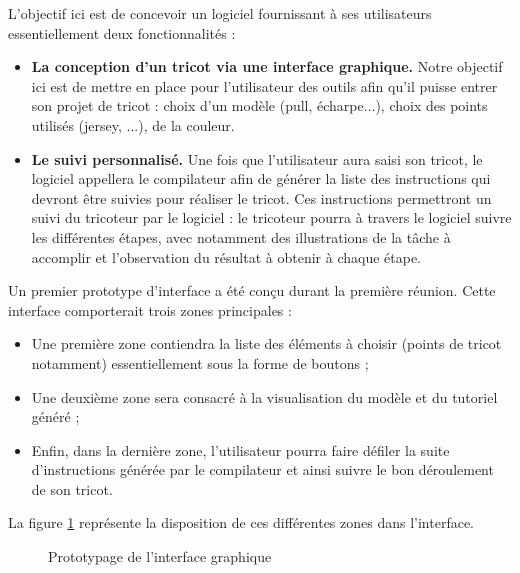 \documentclass{article}
\begin{document}
L'objectif ici est de concevoir un logiciel fournissant à ses utilisateurs essentiellement deux fonctionnalités :
\begin{itemize}
  \item \textbf{La conception d'un tricot via une interface graphique.} Notre objectif ici est de mettre en place pour l'utilisateur des
  outils afin qu'il puisse entrer son projet de tricot : choix d'un modèle (pull, écharpe...), choix des points utilisés
  (jersey, ...), de la couleur.
  \item \textbf{Le suivi personnalisé.} Une fois que l'utilisateur aura saisi son tricot, le logiciel appellera le compilateur afin de générer
la liste des instructions qui devront être suivies pour réaliser le tricot. Ces instructions permettront un suivi du tricoteur par le
logiciel : le tricoteur pourra à travers le logiciel suivre les différentes étapes, avec notamment des illustrations de la tâche à
accomplir et l'observation du résultat à obtenir à chaque étape. \newline
\end{itemize} 

Un premier prototype d'interface a été conçu durant la première réunion. Cette interface comporterait trois zones principales :
\begin{itemize}
  \item Une première zone contiendra la liste des éléments à choisir (points de tricot notamment) essentiellement sous la forme de 
boutons ;
  \item Une deuxième zone sera consacré à la visualisation du modèle et du tutoriel généré ;
  \item Enfin, dans la dernière zone, l'utilisateur pourra faire défiler la suite d'instructions générée par le compilateur et ainsi 
suivre le bon déroulement de son tricot.
\end{itemize}

La figure \ref{interface} représente la disposition de ces différentes zones dans l'interface.

\begin{figure}[!h] %
  \centering
  \caption{Prototypage de l'interface graphique}
  \label{interface}
  \end{figure}
\end{document}
